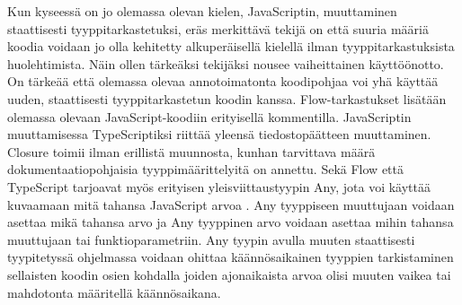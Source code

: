 Kun kyseessä on jo olemassa olevan kielen, JavaScriptin, muuttaminen
staattisesti tyyppitarkastetuksi, eräs merkittävä tekijä on että suuria
määriä koodia voidaan jo olla kehitetty alkuperäisellä kielellä ilman
tyyppitarkastuksista huolehtimista. Näin ollen tärkeäksi tekijäksi nousee
vaiheittainen käyttöönotto. On tärkeää että olemassa olevaa annotoimatonta
koodipohjaa voi yhä käyttää uuden, staattisesti tyyppitarkastetun koodin
kanssa. Flow-tarkastukset lisätään olemassa olevaan JavaScript-koodiin
erityisellä kommentilla. JavaScriptin muuttamisessa TypeScriptiksi riittää
yleensä tiedostopäätteen muuttaminen. Closure toimii ilman erillistä
muunnosta, kunhan tarvittava määrä dokumentaatiopohjaisia tyyppimäärittelyitä
on annettu. Sekä Flow että TypeScript tarjoavat myös erityisen
yleisviittaustyypin Any, jota voi käyttää kuvaamaan mitä tahansa JavaScript
arvoa \cite{TypeScriptSpec}. Any tyyppiseen muuttujaan voidaan asettaa mikä
tahansa arvo ja Any tyyppinen arvo voidaan asettaa mihin tahansa muuttujaan
tai funktioparametriin. Any tyypin avulla muuten staattisesti tyypitetyssä
ohjelmassa voidaan ohittaa käännösaikainen tyyppien tarkistaminen sellaisten
koodin osien kohdalla joiden ajonaikaista arvoa olisi muuten vaikea tai
mahdotonta määritellä käännösaikana.